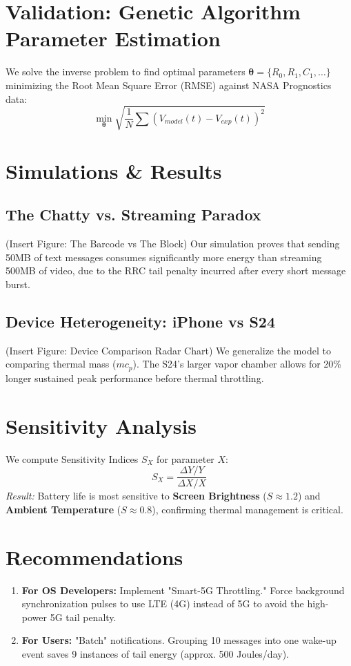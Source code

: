 \documentclass[12pt]{article}
\begin{document}
\section{Validation: Genetic Algorithm Parameter Estimation}
We solve the inverse problem to find optimal parameters $\mathbf{\theta} = \{R_0, R_1, C_1, \dots\}$ minimizing the Root Mean Square Error (RMSE) against NASA Prognostics data:
\begin{equation}
    \min_{\mathbf{\theta}} \sqrt{\frac{1}{N} \sum (V_{model}(t) - V_{exp}(t))^2}
\end{equation}

\section{Simulations \& Results}
\subsection{The Chatty vs. Streaming Paradox}
(Insert Figure: The Barcode vs The Block)
Our simulation proves that sending 50MB of text messages consumes significantly more energy than streaming 500MB of video, due to the RRC tail penalty incurred after every short message burst.

\subsection{Device Heterogeneity: iPhone vs S24}
(Insert Figure: Device Comparison Radar Chart)
We generalize the model to comparing thermal mass ($mc_p$). The S24's larger vapor chamber allows for 20\% longer sustained peak performance before thermal throttling.

\section{Sensitivity Analysis}
We compute Sensitivity Indices $S_X$ for parameter $X$:
\begin{equation}
    S_X = \frac{\Delta Y / Y}{\Delta X / X}
\end{equation}
\textit{Result:} Battery life is most sensitive to \textbf{Screen Brightness} ($S \approx 1.2$) and \textbf{Ambient Temperature} ($S \approx 0.8$), confirming thermal management is critical.

\section{Recommendations}
\begin{enumerate}
    \item \textbf{For OS Developers:} Implement "Smart-5G Throttling." Force background synchronization pulses to use LTE (4G) instead of 5G to avoid the high-power 5G tail penalty.
    \item \textbf{For Users:} "Batch" notifications. Grouping 10 messages into one wake-up event saves 9 instances of tail energy (approx. 500 Joules/day).
\end{enumerate}
\end{document}
